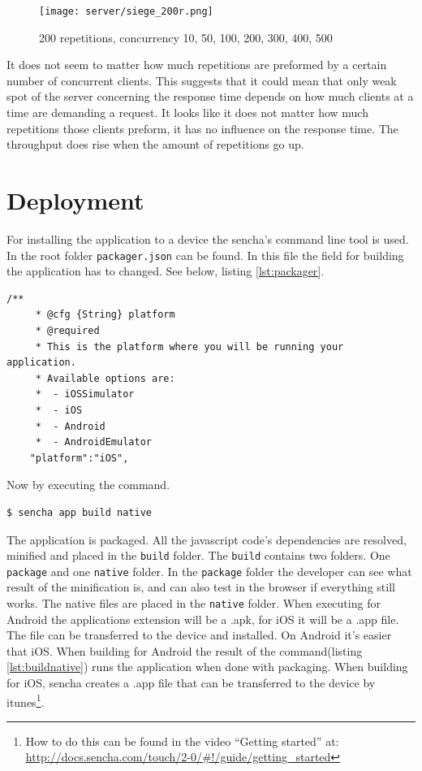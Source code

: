 \begin{figure}[H]
\center
\texttt{[image: server/siege\_200r.png]}
\caption{200 repetitions, concurrency 10, 50, 100, 200, 300, 400, 500}
\end{figure}

It does not seem to matter how much repetitions are preformed by a certain number of concurrent clients. This suggests that it could mean that only weak spot of the server concerning the response time depends on how much clients at a time are demanding a request. It looks like it does not matter how much repetitions those clients preform, it has no influence on the response time.
The throughput does rise when the amount of repetitions go up. 



\section{Deployment}
For installing the application to a device the sencha's command line tool is used. In the root folder \texttt{packager.json} can be found. In this file the field for building the application has to changed. See below, listing \ref{lst:packager}.
\begin{lstlisting}[caption={packager.json},label={lst:packager}]
	/**
	 * @cfg {String} platform
	 * @required
	 * This is the platform where you will be running your application.
	 * Available options are:
	 *  - iOSSimulator
	 *  - iOS
	 *  - Android
	 *  - AndroidEmulator
	"platform":"iOS",
\end{lstlisting}
Now by executing the command.
\label{appnative}
\begin{lstlisting}[caption={command to build native},label={lst:buildnative}]
$ sencha app build native
\end{lstlisting}
The application is packaged. All the javascript code's dependencies are resolved, minified and placed in the \texttt{build} folder. The \texttt{build} contains two folders. One \texttt{package} and one \texttt{native} folder. In the \texttt{package} folder the developer can see what result of the minification is, and can also test in the browser if everything still works. The native files are placed in the \texttt{native} folder. When executing for Android the applications extension will be a .apk, for iOS it will be a .app file.  The file can be transferred to the device and installed. On Android it's easier that iOS. When building for Android the result of the command(listing \ref{lst:buildnative}) runs the application when done with packaging. When building for iOS, sencha creates a .app file that can be transferred to the device by itunes\footnote{How to do this can be found in the video ``Getting started'' at: \url{http://docs.sencha.com/touch/2-0/\#!/guide/getting\_started}}.

